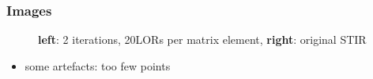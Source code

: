 \documentclass{beamer}
\begin{document}
\begin{frame}
  \frametitle{Images}
  \begin{figure}
    \centering
    \caption{\textbf{left}: 2 iterations, 20LORs per matrix element, \textbf{right}: original STIR}
  \end{figure}
  \begin{itemize}
    \item some artefacts: too few points
  \end{itemize}
\end{frame}
\end{document}
